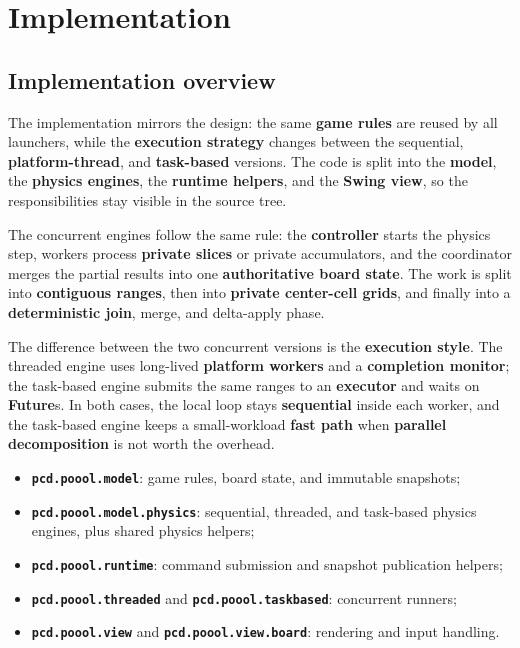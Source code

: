 \clearpage
\section{Implementation}

\subsection{Implementation overview}

The implementation mirrors the design: the same \textbf{game rules} are reused by all launchers, while the \textbf{execution strategy} changes between the sequential, \textbf{platform-thread}, and \textbf{task-based} versions. The code is split into the \textbf{model}, the \textbf{physics engines}, the \textbf{runtime helpers}, and the \textbf{Swing view}, so the responsibilities stay visible in the source tree.

The concurrent engines follow the same rule: the \textbf{controller} starts the physics step, workers process \textbf{private slices} or private accumulators, and the coordinator merges the partial results into one \textbf{authoritative board state}. The work is split into \textbf{contiguous ranges}, then into \textbf{private center-cell grids}, and finally into a \textbf{deterministic join}, merge, and delta-apply phase.

The difference between the two concurrent versions is the \textbf{execution style}. The threaded engine uses long-lived \textbf{platform workers} and a \textbf{completion monitor}; the task-based engine submits the same ranges to an \textbf{executor} and waits on \textbf{Future}s. In both cases, the local loop stays \textbf{sequential} inside each worker, and the task-based engine keeps a small-workload \textbf{fast path} when \textbf{parallel decomposition} is not worth the overhead.

\begin{itemize}
    \item \textbf{\texttt{pcd.poool.model}}: game rules, board state, and immutable snapshots;
    \item \textbf{\texttt{pcd.poool.model.physics}}: sequential, threaded, and task-based physics engines, plus shared physics helpers;
    \item \textbf{\texttt{pcd.poool.runtime}}: command submission and snapshot publication helpers;
    \item \textbf{\texttt{pcd.poool.threaded}} and \textbf{\texttt{pcd.poool.taskbased}}: concurrent runners;
    \item \textbf{\texttt{pcd.poool.view}} and \textbf{\texttt{pcd.poool.view.board}}: rendering and input handling.
\end{itemize}

